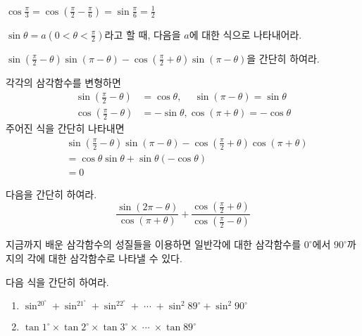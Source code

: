 \documentclass[11pt, a4paper]{book}
\begin{document}
\begin{sample}
	$\cos \frac{\pi}{3} = \cos\left(\frac{\pi}{2}- \frac{\pi}{6}\right)=\sin \frac{\pi}{6}=\frac{1}{2}$
\end{sample}
\vspace{1em}

\begin{problem}
	$\sin\theta = a\left(0<\theta<\frac{\pi}{2}\right)$라고 할 때, 다음을 $a$에 대한 식으로 나타내어라.
\end{problem}

\begin{example}
	$\sin\left(\frac{\pi}{2} -\theta \right)\sin(\pi-\theta) -\cos\left(\frac{\pi}{2}+\theta\right)\sin(\pi-\theta) $을 간단히 하여라.
	\begin{solution}
		각각의 삼각함수를 변형하면
		\begin{align*}
			\sin\left(\frac{\pi}{2}-\theta\right) &=\cos \theta, \phantom{-}\sin(\pi-\theta)=\sin\theta \\
			\cos\left(\frac{\pi}{2}-\theta\right) &=-\sin \theta, \cos(\pi+\theta)=-\cos\theta			
		\end{align*}
	주어진 식을 간단히 나타내면
	\begin{align*}
		&\sin\left(\frac{\pi}{2}-\theta\right) \sin(\pi-\theta) -\cos\left(\frac{\pi}{2}+\theta\right)\cos(\pi+\theta) \\
		&=\cos\theta \sin\theta + \sin\theta(-\cos\theta) \\
		&=0
	\end{align*}
	\end{solution}
\end{example}
\vspace{1em}

\begin{problem}
	다음을 간단히 하여라.
	\[
	\frac{\sin(2\pi-\theta)}{\cos(\pi+\theta)} +\frac{\cos\left(\frac{\pi}{2}+\theta\right)}{\cos\left( \frac{\pi}{2}-\theta\right)}
	\]
\end{problem}

지금까지 배운 삼각함수의 성질들을 이용하면 일반각에 대한 삼각함수를 $0^{\circ}$에서 $90^{\circ}$까지의 각에 대한 삼각함수로 나타낼 수 있다.

\begin{problem}
	다음 식을 간단히 하여라.
	\begin{enumerate}[label=(\arabic*)]
		\item $\sin^20^{\circ} + \sin^21^{\circ} +\sin^22^{\circ} + \;\cdots \; + \sin^{2} 89^{\circ} +\sin^{2} 90^{\circ}$
		\item $\tan 1^{\circ} \times \tan 2^{\circ} \times \tan 3^{\circ} \times \; \cdots \; \times \tan89^{\circ}$
	\end{enumerate}
\end{problem}
\end{document}

